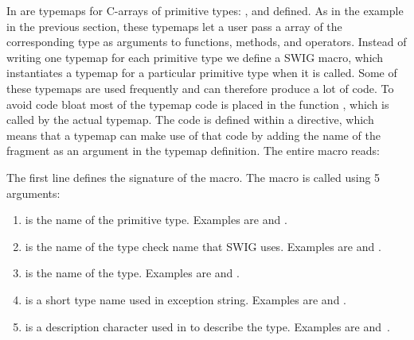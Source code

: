 In  are typemaps for C-arrays of primitive
types: ,  and  defined. As in
the  example in the previous section, these typemaps let a
user pass a \numpy array of the corresponding type as arguments to
functions, methods, and operators. Instead of writing one typemap for
each primitive type we define a SWIG macro, which instantiates a
typemap for a particular primitive type when it is called. Some of these
typemaps are used frequently and can therefore produce a lot of
code. To avoid code bloat most of the typemap code is placed in the
function \-, which
is called by the actual typemap. The code is defined within a
 directive, which means that a typemap can make use of
that code by adding the name of the fragment as an argument in the
typemap definition. The entire macro reads:
The first line defines the signature of the macro. The macro is called
using 5 arguments:
\begin{enumerate}
\item {} is the name of the primitive type. Examples are
 and .

\item {} is the name of the type check name that SWIG uses. Examples
are  and .

\item {} is the name of the \numpy type. Examples are
 and .

\item {} is a short type name used in exception string.
Examples are  and .

\item {} is a description character used in \numpy to describe the
type. Examples are  and~.
\end{enumerate}

